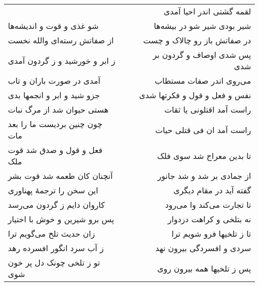\begin{center}
\begin{longtable}{l p{0.5cm} r}
&&
لقمه گشتی اندر احیا آمدی
\\
شو غذی و قوت و اندیشه‌ها
&&
شیر بودی شیر شو در بیشه‌ها
\\
از صفاتش رسته‌ای والله نخست
&&
در صفاتش باز رو چالاک و چست
\\
ز ابر و خورشید و ز گردون آمدی
&&
پس شدی اوصاف و گردون بر شدی
\\
آمدی در صورت باران و تاب
&&
می‌روی اندر صفات مستطاب
\\
جزو شید و ابر و انجمها بدی
&&
نفس و فعل و قول و فکرتها شدی
\\
هستی حیوان شد از مرگ نبات
&&
راست آمد اقتلونی یا ثقات
\\
چون چنین بردیست ما را بعد مات
&&
راست آمد ان فی قتلی حیات
\\
فعل و قول و صدق شد قوت ملک
&&
تا بدین معراج شد سوی فلک
\\
آنچنان کان طعمه شد قوت بشر
&&
از جمادی بر شد و شد جانور
\\
این سخن را ترجمهٔ پهناوری
&&
گفته آید در مقام دیگری
\\
کاروان دایم ز گردون می‌رسد
&&
تا تجارت می‌کند وا می‌رود
\\
پس برو شیرین و خوش با اختیار
&&
نه بتلخی و کراهت دزدوار
\\
زان حدیث تلخ می‌گویم ترا
&&
تا ز تلخیها فرو شویم ترا
\\
ز آب سرد انگور افسرده رهد
&&
سردی و افسردگی بیرون نهد
\\
تو ز تلخی چونک دل پر خون شوی
&&
پس ز تلخیها همه بیرون روی
\\
\end{longtable}
\end{center}
